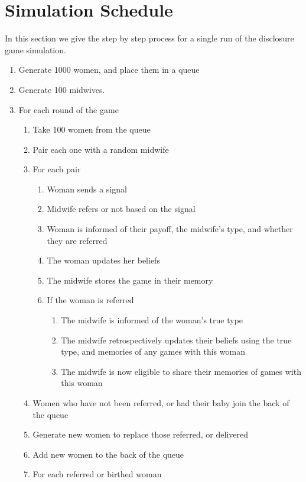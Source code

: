 
\section{Simulation Schedule}
\label{app:sim_schedule}

In this section we give the step by step process for a single run of the disclosure game simulation.

\begin{enumerate}
\item Generate 1000 women, and place them in a queue
\item Generate 100 midwives.
\item For each round of the game
\begin{enumerate}
	\item Take 100 women from the queue
	\item Pair each one with a random midwife
	\item For each pair
	\begin{enumerate}
		\item Woman sends a signal
		\item Midwife refers or not based on the signal
		\item Woman is informed of their payoff, the midwife's type, and whether they are referred
		\item The woman updates her beliefs
		\item The midwife stores the game in their memory
		\item If the woman is referred
		\begin{enumerate}
			\item The midwife is informed of the woman's true type
			\item The midwife retrospectively updates their beliefs using the true type, and memories of any games with this woman
			\item The midwife is now eligible to share their memories of games with this woman
		\end{enumerate}
	\end{enumerate}
	\item Women who have not been referred, or had their baby join the back of the queue
	\item Generate new women to replace those referred, or delivered
	\item Add new women to the back of the queue
	\item For each referred or birthed woman
	\begin{enumerate}

\end{enumerate}
\end{enumerate}
\end{enumerate}
